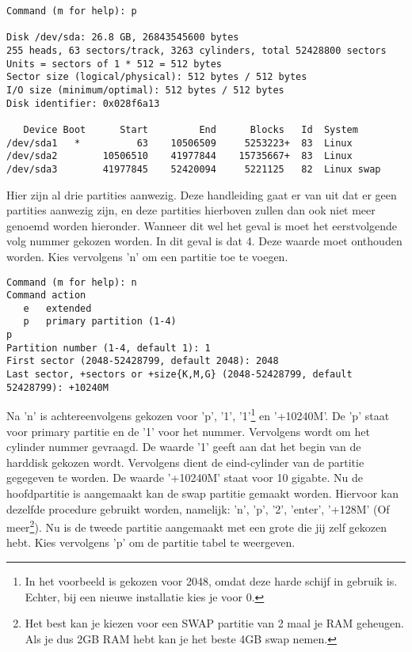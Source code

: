 \begin{lstlisting}
Command (m for help): p

Disk /dev/sda: 26.8 GB, 26843545600 bytes
255 heads, 63 sectors/track, 3263 cylinders, total 52428800 sectors
Units = sectors of 1 * 512 = 512 bytes
Sector size (logical/physical): 512 bytes / 512 bytes
I/O size (minimum/optimal): 512 bytes / 512 bytes
Disk identifier: 0x028f6a13

   Device Boot      Start         End      Blocks   Id  System
/dev/sda1   *          63    10506509     5253223+  83  Linux
/dev/sda2        10506510    41977844    15735667+  83  Linux
/dev/sda3        41977845    52420094     5221125   82  Linux swap
\end{lstlisting}
Hier zijn al drie partities aanwezig. Deze handleiding gaat er van uit dat er geen partities aanwezig zijn, en deze partities hierboven zullen dan ook niet meer genoemd worden hieronder. Wanneer dit wel het geval is moet het eerstvolgende volg nummer gekozen worden. In dit geval is dat 4. Deze waarde moet onthouden worden. Kies vervolgens 'n' om een partitie toe te voegen.
\begin{lstlisting}
Command (m for help): n
Command action
   e   extended
   p   primary partition (1-4)
p
Partition number (1-4, default 1): 1
First sector (2048-52428799, default 2048): 2048
Last sector, +sectors or +size{K,M,G} (2048-52428799, default 52428799): +10240M
\end{lstlisting}
Na 'n' is achtereenvolgens gekozen voor 'p', '1', '1'\footnote{In het voorbeeld is gekozen voor 2048, omdat deze harde schijf in gebruik is. Echter, bij een nieuwe installatie kies je voor 0.}  en '+10240M'. De 'p' staat voor primary partitie en de '1' voor het nummer. Vervolgens wordt om het cylinder nummer gevraagd. De waarde '1' geeft aan dat het begin van de harddisk gekozen wordt. Vervolgens dient de eind-cylinder van de partitie gegegeven te worden. De waarde '+10240M' staat voor 10 gigabte.
Nu de hoofdpartitie is aangemaakt kan de swap partitie gemaakt worden. Hiervoor kan dezelfde procedure gebruikt worden, namelijk: 'n', 'p', '2', 'enter', '+128M' (Of meer\footnote{Het best kan je kiezen voor een SWAP partitie van 2 maal je RAM geheugen. Als je dus 2GB RAM hebt kan je het beste 4GB swap nemen.}). Nu is de tweede partitie aangemaakt met een grote die jij zelf gekozen hebt. Kies vervolgens 'p' om de partitie tabel te weergeven.
